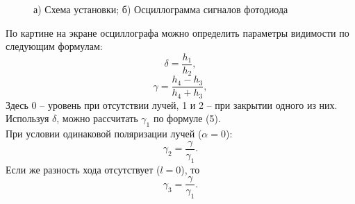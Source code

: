 \documentclass[a4paper,12pt]{report}
\begin{document}
\begin{figure}[h]
\begin{minipage}[h]{0.49\linewidth}
\end{minipage}
\hfill
\begin{minipage}[h]{0.49\linewidth}
\end{minipage}
\caption{а) Схема установки; б) Осциллограмма сигналов фотодиода}
\label{ris:image1}
\end{figure}


По картине на экране осциллографа можно определить параметры видимости по следующим формулам:
\begin{equation}
\delta = \dfrac{h_1}{h_2},
\end{equation}
\begin{equation}
\gamma = \dfrac{h_4 - h_3}{h_4 + h_3},
\end{equation}
Здесь 0 -- уровень при отсутствии лучей, 1 и 2 -- при закрытии одного из них. Используя $\delta$, можно рассчитать $\gamma_1$ по формуле (5).\\ 
При условии одинаковой поляризации лучей ($\alpha = 0$):
\begin{equation}
\gamma_2 = \dfrac{\gamma}{\gamma_1}.
\end{equation}
Если же разность хода отсутствует ($l = 0$), то
\begin{equation}
\gamma_3 = \dfrac{\gamma}{\gamma_1}.
\end{equation}
\end{document}
